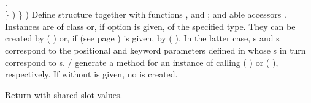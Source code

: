 \begin{LIST}{1cm}
{{{{          \\
        }{.}\\
      }{\}}%
      )%
    }{\}}
    )}
  {
    Define structure  together with functions
    ,  and
    ; and able accessors
    \LIT{-}. Instances are of class  or, if 
     option  is given, of the specified type.
    They can be
    created by ( ) or, if  (see
    page \pageref{section:Functions}) is given, by (
     ). In the latter
    case, s and \kwd{:}s correspond to the positional
    and keyword parameters defined in  whose
    s in turn correspond to s.
    / generate a
     method for an instance  of 
    calling (  ) or (
      ), respectively.
    If  without  is given, no 
    is created.
}

  {
    Return  with shared slot values.
  }

\end{LIST}




